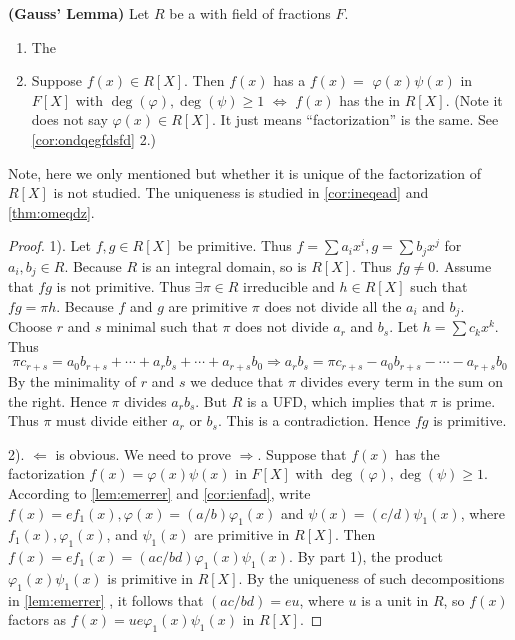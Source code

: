 \documentclass{article}
\newcommand{\bfs}[1]{\textbf{({#1}) }}
\begin{document}
\begin{lema}\bfs{Gauss' Lemma}\label{thm:nbeqfdcc}
Let $R$ be a  with field of fractions $F$.
\begin{enumerate}
    \item The 
    \item Suppose $f(x) \in R[X]$. Then $f(x)$ has a  $f(x)=$ $\varphi(x) \psi(x)$ in $F[X]$ with $\operatorname{deg}(\varphi), \operatorname{deg}(\psi) \geq 1$ $\Longleftrightarrow$ $f(x)$ has the  in $R[X]$. (Note it does not say $\varphi(x)\in R[X]$. It just means  ``factorization'' is the same. See \cref{cor:ondqegfdsfd} 2.)
\end{enumerate}
\end{lema} 
\begin{rema}
Note, here we only mentioned  but whether it is unique of the factorization of $R[X]$ is not studied. The uniqueness is studied in \cref{cor:ineqead} and \cref{thm:omeqdz}.
\end{rema}
\begin{proof}
1). 
 Let $f, g \in R[X]$ be primitive. Thus $f=\sum a_{i} x^{i}, g=\sum b_{j} x^{j}$ for $a_{i}, b_{j} \in R$. Because $R$ is an integral domain, so is $R[X]$. Thus $f g \neq 0$. Assume that $f g$ is not primitive. Thus $\exists \pi \in R$ irreducible and $h \in R[X]$ such that $f g=\pi h$. Because $f$ and $g$ are primitive $\pi$ does not divide all the $a_{i}$ and $b_{j}$. Choose $r$ and $s$ minimal such that $\pi$ does not divide $a_{r}$ and $b_{s}$. Let $h=\sum c_{k} x^{k}$.
 Thus
$$
\pi c_{r+s}=a_{0} b_{r+s}+\cdots+a_{r} b_{s}+\cdots+a_{r+s} b_{0} \Rightarrow a_{r} b_{s}=\pi c_{r+s}-a_{0} b_{r+s}-\cdots-a_{r+s} b_{0}
$$
By the minimality of $r$ and $s$ we deduce that $\pi$ divides every term in the sum on the right. Hence $\pi$ divides $a_{r} b_{s}$. But $R$ is a UFD, which implies that $\pi$ is prime. Thus $\pi$ must divide either $a_{r}$ or $b_{s}$. This is a contradiction. Hence $f g$ is primitive.

2). $\Leftarrow$ is obvious. We need to prove $\Rightarrow$. Suppose that $f(x)$ has the factorization $f(x)=\varphi(x) \psi(x)$ in $F[X]$ with $\operatorname{deg}(\varphi), \operatorname{deg}(\psi) \geq 1$. According to \cref{lem:emerrer} and \cref{cor:ienfad}, write $f(x)=e f_{1}(x), \varphi(x)=(a / b) \varphi_{1}(x)$ and $\psi(x)=(c / d) \psi_{1}(x)$, where $f_{1}(x), \varphi_{1}(x)$, and $\psi_{1}(x)$ are primitive in $R[X]$. Then $f(x)=e f_{1}(x)=(a c / b d) \varphi_{1}(x) \psi_{1}(x)$. By part 1), the product $\varphi_{1}(x) \psi_{1}(x)$ is primitive in $R[X]$. By the uniqueness of such decompositions in \cref{lem:emerrer} , it follows that $(a c / b d)=e u$, where $u$ is a unit in $R$, so $f(x)$ factors as $f(x)=u e \varphi_{1}(x) \psi_{1}(x)$ in $R[X]$.
\end{proof}
\end{document}

